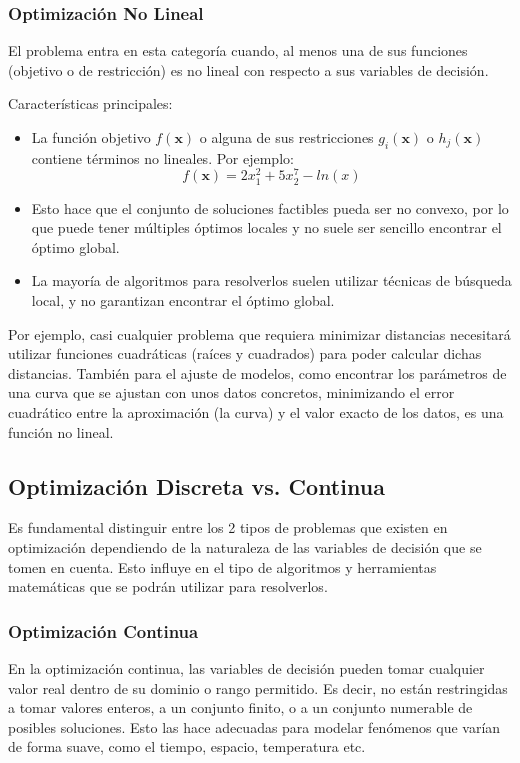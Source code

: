 \documentclass[12pt,a4paper]{book}
\begin{document}
\subsubsection{Optimización No Lineal}
El problema entra en esta categoría cuando, al menos una de sus funciones (objetivo o de restricción) es no lineal con respecto a sus variables de decisión. 

Características principales:
\begin{itemize}
    \item La función objetivo $f(\mathbf{x})$ o alguna de sus restricciones $g_i(\mathbf{x})$ o $h_j(\mathbf{x})$ contiene términos no lineales. Por ejemplo:
    $$f(\mathbf{x})=2x_1^2+5x_2^7-ln(x)$$
    \item Esto hace que el conjunto de soluciones factibles pueda ser no convexo, por lo que puede tener múltiples óptimos locales y no suele ser sencillo encontrar el óptimo global.
    \item La mayoría de algoritmos para resolverlos suelen utilizar técnicas de búsqueda local, y no garantizan encontrar el óptimo global.
\end{itemize}

Por ejemplo, casi cualquier problema que requiera minimizar distancias necesitará utilizar funciones cuadráticas (raíces y cuadrados) para poder calcular dichas distancias.
También para el ajuste de modelos, como encontrar los parámetros de una curva que se ajustan con unos datos concretos, minimizando el error cuadrático entre la aproximación (la curva) y el valor exacto de los datos, es una función no lineal.



\subsection{Optimización Discreta vs. Continua}
Es fundamental distinguir entre los 2 tipos de problemas que existen en optimización dependiendo de la naturaleza de las variables de decisión que se tomen en cuenta. Esto influye en el tipo de algoritmos y herramientas matemáticas que se podrán utilizar para resolverlos.

\subsubsection{Optimización Continua}
En la optimización continua, las variables de decisión pueden tomar cualquier valor real dentro de su dominio o rango permitido. Es decir, no están restringidas a tomar valores enteros, a un conjunto finito, o a un conjunto numerable de posibles soluciones. Esto las hace adecuadas para modelar fenómenos que varían de forma suave, como el tiempo, espacio, temperatura etc.
\end{document}
